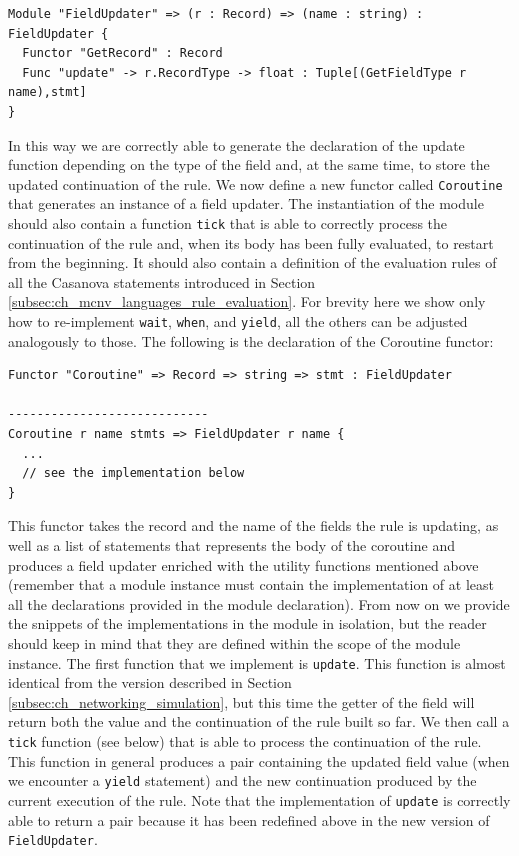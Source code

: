 \begin{lstlisting}
Module "FieldUpdater" => (r : Record) => (name : string) : FieldUpdater {
  Functor "GetRecord" : Record
  Func "update" -> r.RecordType -> float : Tuple[(GetFieldType r name),stmt]
}
\end{lstlisting}

\noindent
In this way we are correctly able to generate the declaration of the update function depending on the type of the field and, at the same time, to store the updated continuation of the rule. We now define a new functor called \texttt{Coroutine} that generates an instance of a field updater. The instantiation of the module should also contain a function \texttt{tick} that is able to correctly process the continuation of the rule and, when its body has been fully evaluated, to restart from the beginning. It should also contain a definition of the evaluation rules of all the Casanova statements introduced in Section \ref{subsec:ch_mcnv_languages_rule_evaluation}. For brevity here we show only how to re-implement \texttt{wait}, \texttt{when}, and \texttt{yield}, all the others can be adjusted analogously to those. The following is the declaration of the Coroutine functor:

\begin{lstlisting}
Functor "Coroutine" => Record => string => stmt : FieldUpdater

----------------------------
Coroutine r name stmts => FieldUpdater r name {
  ... 
  // see the implementation below
}
\end{lstlisting}

\noindent
This functor takes the record and the name of the fields the rule is updating, as well as a list of statements that represents the body of the coroutine and produces a field updater enriched with the utility functions mentioned above (remember that a module instance must contain the implementation of at least all the declarations provided in the module declaration). From now on we provide the snippets of the implementations in the module in isolation, but the reader should keep in mind that they are defined within the scope of the module instance. The first function that we implement is \texttt{update}. This function is almost identical from the version described in Section \ref{subsec:ch_networking_simulation}, but this time the getter of the field will return both the value and the continuation of the rule built so far. We then call a \texttt{tick} function (see below) that is able to process the continuation of the rule. This function in general produces a pair containing the updated field value (when we encounter a \texttt{yield} statement) and the new continuation produced by the current execution of the rule. Note that the implementation of \texttt{update} is correctly able to return a pair because it has been redefined above in the new version of \texttt{FieldUpdater}.

